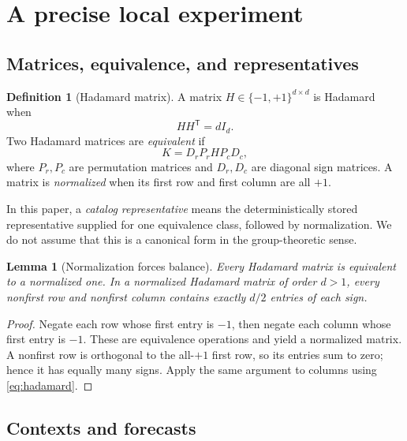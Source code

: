 \documentclass[10pt,twoside]{article}
\theoremstyle{noteplain}
\newtheorem{lemma}[theorem]{Lemma}
\theoremstyle{definition}
\newtheorem{definition}[theorem]{Definition}
\begin{document}
\section{A precise local experiment}

\subsection{Matrices, equivalence, and representatives}

\begin{definition}[Hadamard matrix]
A matrix $H\in\{-1,+1\}^{d\times d}$ is Hadamard when
\begin{equation}\label{eq:hadamard}
HH^{\mathsf T}=dI_d.
\end{equation}
Two Hadamard matrices are \emph{equivalent} if
\begin{equation}\label{eq:equivalence}
K=D_rP_rHP_cD_c,
\end{equation}
where $P_r,P_c$ are permutation matrices and $D_r,D_c$ are diagonal sign matrices.  A matrix is \emph{normalized} when its first row and first column are all $+1$.
\end{definition}

In this paper, a \emph{catalog representative} means the deterministically stored representative supplied for one equivalence class, followed by normalization.  We do not assume that this is a canonical form in the group-theoretic sense.

\begin{lemma}[Normalization forces balance]\label{lem:balance}
Every Hadamard matrix is equivalent to a normalized one.  In a normalized Hadamard matrix of order $d>1$, every nonfirst row and nonfirst column contains exactly $d/2$ entries of each sign.
\end{lemma}

\begin{proof}
Negate each row whose first entry is $-1$, then negate each column whose first entry is $-1$.  These are equivalence operations and yield a normalized matrix.  A nonfirst row is orthogonal to the all-$+1$ first row, so its entries sum to zero; hence it has equally many signs.  Apply the same argument to columns using \eqref{eq:hadamard}.
\end{proof}

\subsection{Contexts and forecasts}
\end{document}
